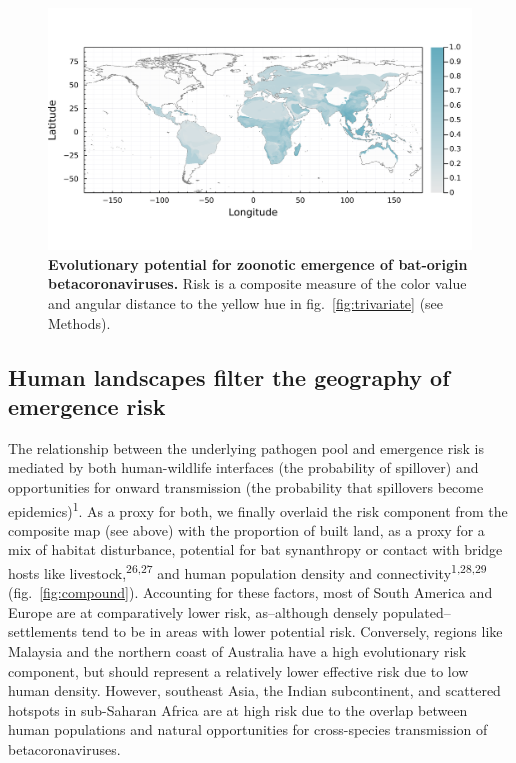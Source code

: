 \documentclass[11pt]{article}
\makeatletter
\def\maxwidth{\ifdim\Gin@nat@width>\linewidth\linewidth
\else\Gin@nat@width\fi}
\let\Oldincludegraphics\includegraphics
\renewcommand{\includegraphics}[1]{\Oldincludegraphics[width=\maxwidth]{#1}}
\makeatother
\begin{document}
\begin{figure}
\hypertarget{fig:risk}{%
\centering
\includegraphics{figures/risk_map.png}
\caption{\textbf{Evolutionary potential for zoonotic emergence of
bat-origin betacoronaviruses.} Risk is a composite measure of the color
value and angular distance to the yellow hue in
fig.~\ref{fig:trivariate} (see Methods).}\label{fig:risk}
}
\end{figure}

\hypertarget{human-landscapes-filter-the-geography-of-emergence-risk}{%
\subsection{Human landscapes filter the geography of emergence
risk}\label{human-landscapes-filter-the-geography-of-emergence-risk}}

The relationship between the underlying pathogen pool and emergence risk
is mediated by both human-wildlife interfaces (the probability of
spillover) and opportunities for onward transmission (the probability
that spillovers become epidemics)\textsuperscript{1}. As a proxy for
both, we finally overlaid the risk component from the composite map (see
above) with the proportion of built land, as a proxy for a mix of
habitat disturbance, potential for bat synanthropy or contact with
bridge hosts like livestock,\textsuperscript{26,27} and human population
density and connectivity\textsuperscript{1,28,29}
(fig.~\ref{fig:compound}). Accounting for these factors, most of South
America and Europe are at comparatively lower risk, as--although densely
populated--settlements tend to be in areas with lower potential risk.
Conversely, regions like Malaysia and the northern coast of Australia
have a high evolutionary risk component, but should represent a
relatively lower effective risk due to low human density. However,
southeast Asia, the Indian subcontinent, and scattered hotspots in
sub-Saharan Africa are at high risk due to the overlap between human
populations and natural opportunities for cross-species transmission of
betacoronaviruses.
\end{document}
